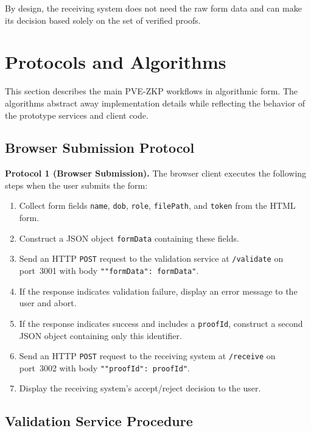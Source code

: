 By design, the receiving system does not need the raw form data and can make
its decision based solely on the set of verified proofs.

\section{Protocols and Algorithms}

This section describes the main PVE-ZKP workflows in algorithmic form. The
algorithms abstract away implementation details while reflecting the behavior
of the prototype services and client code.

\subsection{Browser Submission Protocol}

\textbf{Protocol 1 (Browser Submission).} The browser client executes the
following steps when the user submits the form:

\begin{enumerate}[leftmargin=*]
  \item Collect form fields \texttt{name}, \texttt{dob}, \texttt{role},
        \texttt{filePath}, and \texttt{token} from the HTML form.
  \item Construct a JSON object \texttt{formData} containing these fields.
  \item Send an HTTP \texttt{POST} request to the validation service at
        \texttt{/validate} on port~3001 with body
        \texttt{"{"formData": formData}"}.
  \item If the response indicates validation failure, display an error message
        to the user and abort.
  \item If the response indicates success and includes a \texttt{proofId},
        construct a second JSON object containing only this identifier.
  \item Send an HTTP \texttt{POST} request to the receiving system at
        \texttt{/receive} on port~3002 with body
        \texttt{"{"proofId": proofId}"}.
  \item Display the receiving system's accept/reject decision to the user.
\end{enumerate}

\subsection{Validation Service Procedure}

